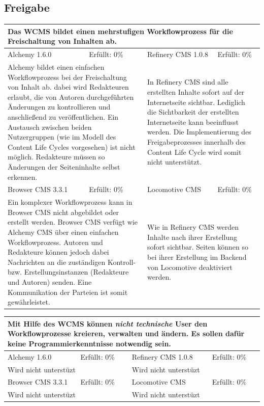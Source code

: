 \subsection{Freigabe}
\begin{tabular}[!ht]{|l|l|l|l|}
\hline
\multicolumn{4}{|p{15cm}|}{\textbf{Das WCMS bildet einen mehrstufigen Workflowprozess für die Freischaltung von Inhalten ab.}} \\
\hline
  Alchemy 1.6.0 & \cellcolor{red}Erfüllt: 0\% & Refinery CMS 1.0.8 & \cellcolor{red}Erfüllt: 0\% \\
  \hline
  \multicolumn{2}{|p{7.5cm}|}{Alchemy bildet einen einfachen Workflowprozess bei der Freischaltung von Inhalt ab. dabei wird Redakteuren erlaubt, die von Autoren durchgeführten Änderungen zu kontrollieren und anschließend zu veröffentlichen. Ein Austausch zwischen beiden Nutzergruppen (wie im Modell des Content Life Cycles vorgesehen) ist nicht möglich. Redakteure müssen so Änderungen der Seiteninhalte selbst erkennen.} & \multicolumn{2}{p{7.5cm}|}{In Refinery CMS sind alle erstellten Inhalte sofort auf der Internetseite sichtbar. Lediglich die Sichtbarkeit der erstellten Internetseite kann beeinflusst werden. Die Implementierung des Freigabeprozesses innerhalb des Content Life Cycle wird somit nicht unterstützt.} \\
\hline
Browser CMS 3.3.1 & \cellcolor{red}Erfüllt: 0\% & Locomotive CMS & \cellcolor{red}Erfüllt: 0\% \\
  \multicolumn{2}{|p{7.5cm}|}{Ein komplexer Workflowprozess kann in Browser CMS nicht abgebildet oder erstellt werden. Browser CMS verfügt wie Alchemy CMS über einen einfachen Workflowprozess. Autoren und Redakteure können jedoch dabei Nachrichten an die zuständigen Kontroll- bzw. Erstellungsinstanzen (Redakteure und Autoren) senden. Eine Kommunikation der Parteien ist somit gewährleistet.} & \multicolumn{2}{p{7.5cm}|}{Wie in Refinery CMS werden Inhalte nach ihrer Erstellung sofort sichtbar. Seiten können so bei ihrer Erstellung im Backend von Locomotive deaktiviert werden.} \\
\hline
\end{tabular}
\newline
\newline
\newline
\begin{tabular}[!ht]{|l|l|l|l|}
\hline
\multicolumn{4}{|p{15cm}|}{\textbf{Mit Hilfe des WCMS können \emph{nicht technische} User den Workflowprozesse kreieren, verwalten und ändern. Es sollen dafür keine Programmierkenntnisse notwendig sein.}} \\
\hline
  Alchemy 1.6.0 & \cellcolor{red}Erfüllt: 0\% & Refinery CMS 1.0.8 & \cellcolor{red}Erfüllt: 0\% \\
  \hline
  \multicolumn{2}{|p{7.5cm}|}{Wird nicht unterstüzt} & \multicolumn{2}{p{7.5cm}|}{Wird nicht unterstüzt} \\
  \hline
  Browser CMS 3.3.1 & \cellcolor{red}Erfüllt: 0\% & Locomotive CMS & \cellcolor{red}Erfüllt: 0\% \\
  \hline
  \multicolumn{2}{|p{7.5cm}|}{Wird nicht unterstüzt} & \multicolumn{2}{p{7.5cm}|}{Wird nicht unterstüzt} \\
\hline
\end{tabular}
